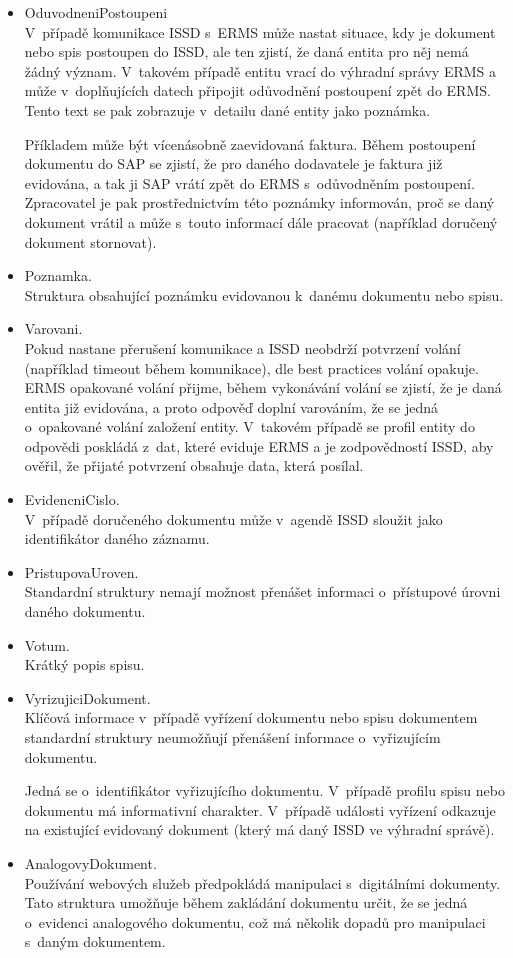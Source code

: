 \documentclass[
  master,
  field=ainfp,
  biblatex,
  language=czech,
  glossaries,
  theorems=false,
  index
]{kidiplom}
\begin{document}
\begin{itemize}
	\item OduvodneniPostoupeni\\
	V~případě komunikace ISSD s~ERMS může nastat situace, kdy je dokument nebo spis postoupen do ISSD, ale ten zjistí, že daná entita pro něj nemá žádný význam. V~takovém případě entitu vrací do výhradní správy ERMS a může v~doplňujících datech připojit odůvodnění postoupení zpět do ERMS. Tento text se pak zobrazuje v~detailu dané entity jako poznámka.
	
	Příkladem může být vícenásobně zaevidovaná faktura. Během postoupení dokumentu do SAP se zjistí, že pro daného dodavatele je faktura již evidována, a tak ji SAP vrátí zpět do ERMS s~odůvodněním postoupení. Zpracovatel je pak prostřednictvím této poznámky informován, proč se daný dokument vrátil a může s~touto informací dále pracovat (například doručený dokument stornovat).
	\item Poznamka.\\
	Struktura obsahující poznámku evidovanou k~danému dokumentu nebo spisu.
	\item Varovani.\\
	 Pokud nastane přerušení komunikace a ISSD neobdrží potvrzení volání (například timeout během komunikace), dle best practices\cite{o01} volání opakuje. ERMS opakované volání přijme, během vykonávání volání se zjistí, že je daná entita již evidována, a proto odpověď doplní varováním, že se jedná o~opakované volání založení entity. V~takovém případě se profil entity do odpovědi poskládá z~dat, které eviduje ERMS a je zodpovědností ISSD, aby ověřil, že přijaté potvrzení obsahuje data, která posílal.
	 \item EvidencniCislo.\\
	 V~případě doručeného dokumentu může v~agendě ISSD sloužit jako identifikátor daného záznamu.
	 \item PristupovaUroven.\\
	 Standardní struktury nemají možnost přenášet informaci o~přístupové úrovni daného dokumentu.
	 \item Votum.\\
	 Krátký popis spisu.
	 \item VyrizujiciDokument.\\
	 Klíčová informace v~případě vyřízení dokumentu nebo spisu dokumentem standardní struktury neumožňují přenášení informace o~vyřizujícím dokumentu.
	 
Jedná se o~identifikátor vyřizujícího dokumentu. V~případě profilu spisu nebo dokumentu má informativní charakter. V~případě události vyřízení odkazuje na existující evidovaný dokument (který má daný ISSD ve výhradní správě).
	 \item AnalogovyDokument.\\
	 Používání webových služeb předpokládá manipulaci s~digitálními dokumenty. Tato struktura umožňuje během zakládání dokumentu určit, že se jedná o~evidenci analogového dokumentu, což má několik dopadů pro manipulaci s~daným dokumentem.
	 

\end{itemize}
\end{document}
